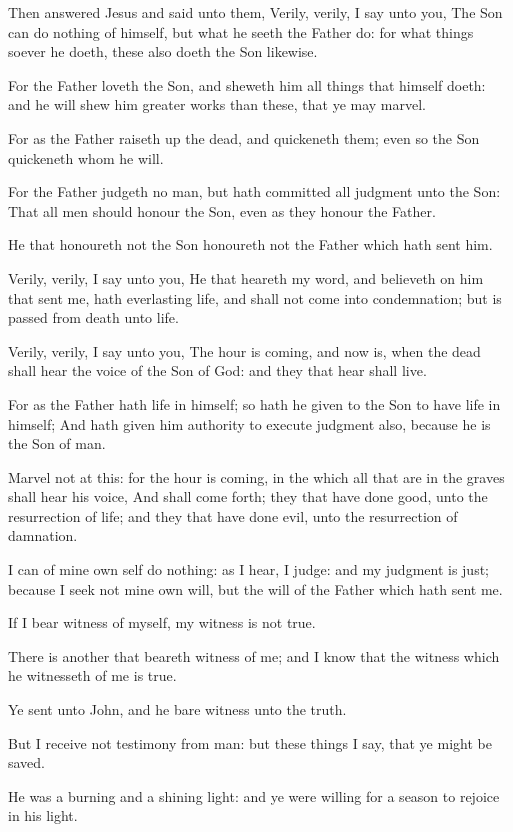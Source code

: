 \Verse Then answered Jesus and said unto them, Verily, verily, I say unto you, The Son can do nothing of himself, but what he seeth the Father do: for what things soever he doeth, these also doeth the Son likewise.

\Verse For the Father loveth the Son, and sheweth him all things that himself doeth: and he will shew him greater works than these, that ye may marvel.

\Verse For as the Father raiseth up the dead, and quickeneth them; even so the Son quickeneth whom he will.

\Verse For the Father judgeth no man, but hath committed all judgment unto the Son: \Verse That all men should honour the Son, even as they honour the Father.

He that honoureth not the Son honoureth not the Father which hath sent him.

\Verse Verily, verily, I say unto you, He that heareth my word, and believeth on him that sent me, hath everlasting life, and shall not come into condemnation; but is passed from death unto life.

\Verse Verily, verily, I say unto you, The hour is coming, and now is, when the dead shall hear the voice of the Son of God: and they that hear shall live.

\Verse For as the Father hath life in himself; so hath he given to the Son to have life in himself; \Verse And hath given him authority to execute judgment also, because he is the Son of man.

\Verse Marvel not at this: for the hour is coming, in the which all that are in the graves shall hear his voice, \Verse And shall come forth; they that have done good, unto the resurrection of life; and they that have done evil, unto the resurrection of damnation.

\Verse I can of mine own self do nothing: as I hear, I judge: and my judgment is just; because I seek not mine own will, but the will of the Father which hath sent me.

\Verse If I bear witness of myself, my witness is not true.

\Verse There is another that beareth witness of me; and I know that the witness which he witnesseth of me is true.

\Verse Ye sent unto John, and he bare witness unto the truth.

\Verse But I receive not testimony from man: but these things I say, that ye might be saved.

\Verse He was a burning and a shining light: and ye were willing for a season to rejoice in his light.


